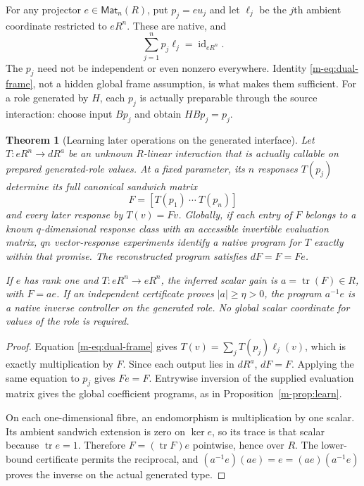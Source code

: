 \documentclass[11pt]{article}
\newtheorem{theorem}{Theorem}[section]
\theoremstyle{definition}
\theoremstyle{remark}
\newcommand{\Mat}{\mathsf{Mat}}
\newcommand{\tr}{\operatorname{tr}}
\newcommand{\id}{\operatorname{id}}
\begin{document}
For any projector $e\in\Mat_n(R)$, put $p_j=eu_j$ and let $\ell_j$ be the $j$th ambient coordinate restricted to $eR^n$. These are native, and
\begin{equation}\label{m-eq:dual-frame}
                  \sum_{j=1}^n p_j\ell_j=\id_{eR^n}.
\end{equation}
The $p_j$ need not be independent or even nonzero everywhere. Identity \eqref{m-eq:dual-frame}, not a hidden global frame assumption, is what makes them sufficient. For a role generated by $H$, each $p_j$ is actually preparable through the source interaction: choose input $Bp_j$ and obtain $HBp_j=p_j$.

\begin{theorem}[Learning later operations on the generated interface]\label{m-thm:later}
Let $T:eR^n\to dR^a$ be an unknown $R$-linear interaction that is actually callable on prepared generated-role values. At a fixed parameter, its $n$ responses $T(p_j)$ determine its full canonical sandwich matrix
\[
                    F=[T(p_1)\ \cdots\ T(p_n)]
\]
and every later response by $T(v)=Fv$. Globally, if each entry of $F$ belongs to a known $q$-dimensional response class with an accessible invertible evaluation matrix, $qn$ vector-response experiments identify a native program for $T$ exactly within that promise. The reconstructed program satisfies $dF=F=Fe$.

If $e$ has rank one and $T:eR^n\to eR^n$, the inferred scalar gain is $a=\tr(F)\in R$, with $F=ae$. If an independent certificate proves $|a|\ge\eta>0$, the program $a^{-1}e$ is a native inverse controller on the generated role. No global scalar coordinate for values of the role is required.
\end{theorem}
\begin{proof}
Equation \eqref{m-eq:dual-frame} gives $T(v)=\sum_jT(p_j)\ell_j(v)$, which is exactly multiplication by $F$. Since each output lies in $dR^a$, $dF=F$. Applying the same equation to $p_j$ gives $Fe=F$. Entrywise inversion of the supplied evaluation matrix gives the global coefficient programs, as in Proposition~\ref{m-prop:learn}.

On each one-dimensional fibre, an endomorphism is multiplication by one scalar. Its ambient sandwich extension is zero on $\ker e$, so its trace is that scalar because $\tr e=1$. Therefore $F=(\tr F)e$ pointwise, hence over $R$. The lower-bound certificate permits the reciprocal, and $(a^{-1}e)(ae)=e=(ae)(a^{-1}e)$ proves the inverse on the actual generated type.
\end{proof}
\end{document}
